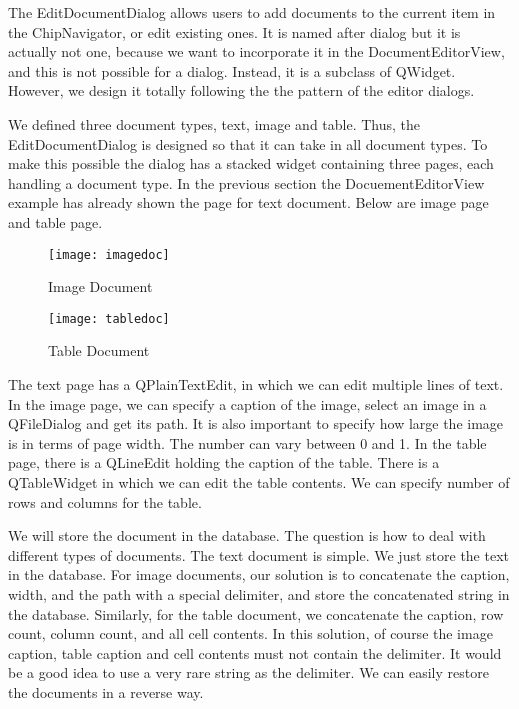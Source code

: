 The EditDocumentDialog allows users to add documents to the current item in the ChipNavigator, or edit existing ones. It is named after dialog but it is actually not one, because we want to incorporate it in the DocumentEditorView, and this is not possible for a dialog. Instead, it is a subclass of QWidget. However, we design it totally following the the pattern of the editor dialogs.

We defined three document types, text, image and table. Thus, the EditDocumentDialog is designed so that it can take in all document types. To make this possible the dialog has a stacked widget containing three pages, each handling a document type. In the previous section the DocuementEditorView example has already shown the page for text document. Below are image page and table page.

\begin{figure}[htbp]
\centering
\texttt{[image: imagedoc]}
\caption{Image Document\label{fig:Image Document}}
\end{figure}

\begin{figure}[htbp]
\centering
\texttt{[image: tabledoc]}
\caption{Table Document\label{fig:Table Document}}
\end{figure}

The text page has a QPlainTextEdit, in which we can edit multiple lines of text. In the image page, we can specify a caption of the image, select an image in a QFileDialog and get its path. It is also important to specify how large the image is in terms of page width. The number can vary between 0 and 1. In the table page, there is a QLineEdit holding the caption of the table. There is a QTableWidget in which we can edit the table contents. We can specify number of rows and columns for the table.

We will store the document in the database. The question is how to deal with different types of documents. The text document is simple. We just store the text in the database. For image documents, our solution is to concatenate the caption, width, and the path with a special delimiter, and store the concatenated string in the database. Similarly, for the table document, we concatenate the caption, row count, column count, and all cell contents. In this solution, of course the image caption, table caption and cell contents must not contain the delimiter. It would be a good idea to use a very rare string as the delimiter. We can easily restore the documents in a reverse way.

